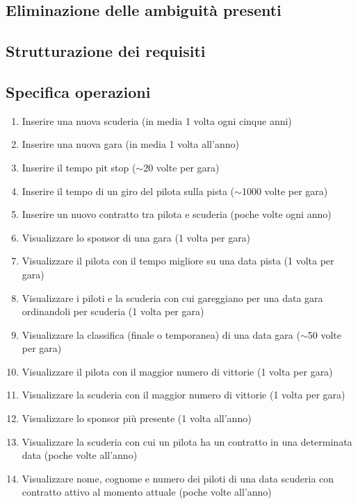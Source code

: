 \documentclass[11pt]{article}
\begin{document}
\subsection{Eliminazione delle ambiguità presenti}
\subsection{Strutturazione dei requisiti}
\subsection{Specifica operazioni}
\begin{enumerate}
    \item Inserire una nuova scuderia (in media 1 volta ogni cinque anni)
    \item Inserire una nuova gara (in media 1 volta all'anno)
    \item Inserire il tempo pit stop ($\sim$20 volte per gara)
    \item Inserire il tempo di un giro del pilota sulla pista ($\sim$1000 volte per gara)
    \item Inserire un nuovo contratto tra pilota e scuderia (poche volte ogni anno)
    \item Visualizzare lo sponsor di una gara (1 volta per gara)
    \item Visualizzare il pilota con il tempo migliore su una data pista (1 volta per gara)
    \item Visualizzare i piloti e la scuderia con cui gareggiano per una data gara ordinandoli per scuderia (1 volta per gara)
    \item Visualizzare la classifica (finale o temporanea) di una data gara ($\sim$50 volte per gara)
    \item Visualizzare il pilota con il maggior numero di vittorie (1 volta per gara)
    \item Visualizzare la scuderia con il maggior numero di vittorie (1 volta per gara)
    \item Visualizzare lo sponsor più presente (1 volta all'anno)
    \item Visualizzare la scuderia con cui un pilota ha un contratto in una determinata data (poche volte all'anno)
    \item Visualizzare nome, cognome e numero dei piloti di una data scuderia con contratto attivo al momento attuale (poche volte all'anno)
\end{enumerate}
\end{document}
